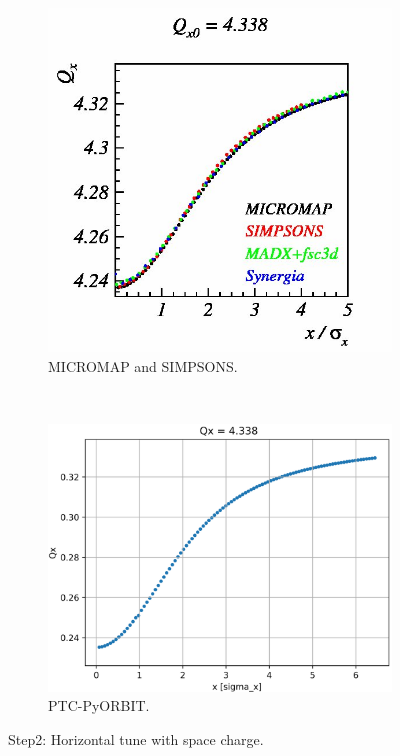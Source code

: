 \documentclass[a4paper]{cernatsnote}
\begin{document}
\begin{figure}
        \centering
        \begin{subfigure}{.5\textwidth}
          \centering
          \includegraphics[width=\textwidth]{Step2_tune_x.png}
          \caption{MICROMAP and SIMPSONS.}
          \label{fig:step2H_m}
        \end{subfigure}~~~~~~
        \begin{subfigure}{.5\textwidth}
          \centering
          \includegraphics[width=\textwidth]{Step2_tune_x_PO.png}
          \caption{PTC-PyORBIT.}
          \label{fig:step2H_po}
        \end{subfigure}
        \caption{Step2: Horizontal tune with space charge.}
        \label{fig:step2H}
\end{figure}
\end{document}
